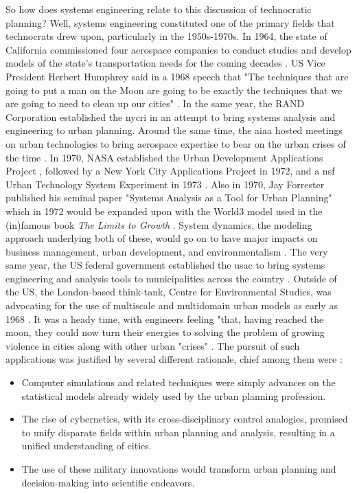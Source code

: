 So how does systems engineering relate to this discussion of technocratic planning? Well, systems engineering constituted one of the primary fields that technocrats drew upon, particularly in the 1950s-1970s. In 1964, the state of California commissioned four aerospace companies to conduct studies and develop models of the state's transportation needs for the coming decades \cite{smithSystemsApproachUrban1968}. US Vice President Herbert Humphrey said in a 1968 speech that "The techniques that are going to put a man on the Moon are going to be exactly the techniques that we are going to need to clean up our cities" \cite{lightWarfareWelfareDefense2005}. In the same year, the RAND Corporation established the \ac{nycri} in an attempt to bring systems analysis and engineering to urban planning. Around the same time, the \ac{aiaa} hosted meetings on urban technologies to bring aerospace expertise to bear on the urban crises of the time \cite{lightWarfareWelfareDefense2005}. In 1970, NASA established the Urban Development Applications Project \cite{fosterUrbanDevelopmentApplications1970}, followed by a New York City Applications Project in 1972, and a \ac{nsf} Urban Technology System Experiment in 1973 \cite{karenTechnologyTransferNew1973}. Also in 1970, Jay Forrester published his seminal paper "Systems Analysis as a Tool for Urban Planning" \cite{forresterSystemsAnalysisTool1970} which in 1972 would be expanded upon with the World3 model used in the (in)famous book \textit{The Limits to Growth} \cite{meadowsLimitsGrowth1972}. System dynamics, the modeling approach underlying both of these, would go on to have major impacts on business management, urban development, and environmentalism \cite{forresterSystemDynamicsPersonal2007a}. The very same year, the US federal government established the \ac{usac} to bring systems engineering and analysis tools to municipalities across the country \cite{kraemerRequiemUSAC1979}. Outside of the US, the London-based think-tank, Centre for Environmental Studies, was advocating for the use of multiscale and multidomain urban models as early as 1968 \cite{wilsonModellingSystemsAnalysis1968}. It was a heady time, with engineers feeling "that, having reached the moon, they could now turn their energies to solving the problem of growing violence in cities along with other urban "crises" \cite{mazza2017}. The pursuit of such applications was justified by several different rationale, chief among them were \cite{lightWarfareWelfareDefense2005}: 

\begin{itemize} \setlength{\itemsep}{0pt} \setlength{\parskip}{0pt} 
	\item{Computer simulations and related techniques were simply advances on the statistical models already widely used by the urban planning profession.}
	\item{The rise of cybernetics, with its cross-disciplinary control analogies, promised to unify disparate fields within urban planning and analysis, resulting in a unified understanding of cities.}
	\item{The use of these military innovations would transform urban planning and decision-making into scientific endeavors.}
\end{itemize}

